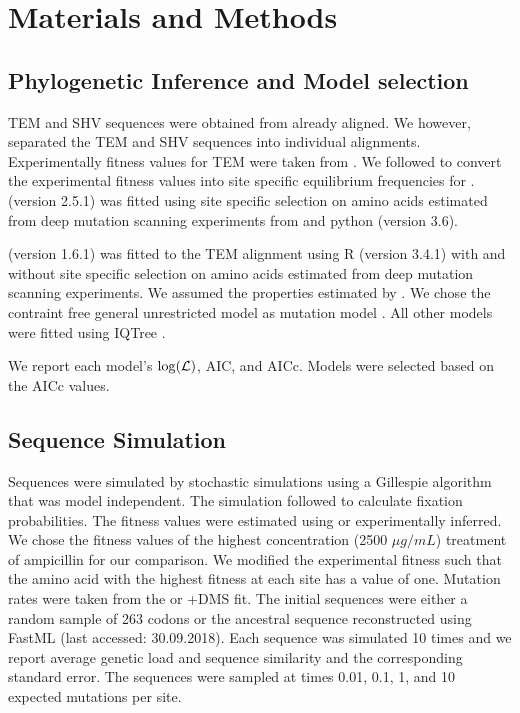 \documentclass[12pt]{article}
\begin{document}
\section*{Materials and Methods}

\subsection*{Phylogenetic Inference and Model selection}

TEM and SHV sequences were obtained from \citet{bloom2017} already aligned.
We however, separated the TEM and SHV sequences into individual alignments.
Experimentally fitness values for TEM were taken from \citet{stiffler2016}.
We followed \citep{bloom2017} to convert the experimental fitness values into site specific equilibrium frequencies for \phydms. 
\phydms (version 2.5.1) was fitted using site specific selection on amino acids estimated from deep mutation scanning experiments from \citet{stiffler2016} and python (version 3.6).

\selac (version 1.6.1) was fitted to the TEM alignment using R (version 3.4.1) \citep{rcore} with and without site specific selection on amino acids estimated from deep mutation scanning experiments.
We assumed the \PC properties estimated by \citet{grantham1974}.
We chose the contraint free  general unrestricted model \citep{yang1994} as mutation model .
All other models were fitted using IQTree \citep{nguyen2015}.

We report each model's $\log(\mathcal{L})$, AIC, and  AICc. 
Models were selected based on the AICc values.

\subsection*{Sequence Simulation}

Sequences were simulated by stochastic simulations using a Gillespie algorithm \citep{gillespie1976} that was model independent.
The simulation followed \citet{SellaAndHirsh2005} to calculate fixation probabilities.
The fitness values were estimated using \selac or experimentally inferred.
We chose the fitness values of the highest concentration (2500 $\mu g/mL$) treatment of ampicillin for our comparison.
We modified the experimental fitness such that the amino acid with the highest fitness at each site has a value of one.
Mutation rates were taken from the \selac or \selac+DMS fit.
The initial sequences were either a random sample of 263 codons or the ancestral sequence reconstructed using FastML \citep{fastml} (last accessed: 30.09.2018).
Each sequence was simulated 10 times and we report average genetic load and sequence similarity and the corresponding standard error.
The sequences were sampled at times 0.01, 0.1, 1, and 10 expected mutations per site.
\end{document}
